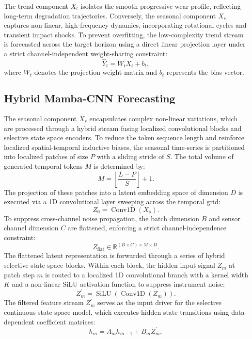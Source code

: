 \documentclass[cmes,article,submit,moreauthors,pdftex]{Definitions/tsp}
\begin{document}
The trend component $X_{t}$ isolates the smooth progressive wear profile, reflecting long-term degradation trajectories. Conversely, the seasonal component $X_{s}$ captures non-linear, high-frequency dynamics, incorporating rotational cycles and transient impact shocks. To prevent overfitting, the low-complexity trend stream is forecasted across the target horizon using a direct linear projection layer under a strict channel-independent weight-sharing constraint:
\begin{equation}
\widehat{Y}_{t} = W_{t} X_{t} + b_{t},
\tag{3}
\end{equation}
where $W_{t}$ denotes the projection weight matrix and $b_{t}$ represents the bias vector.

\subsection{Hybrid Mamba-CNN Forecasting} \label{sect:s3dot3}
The seasonal component $X_{s}$ encapsulates complex non-linear variations, which are processed through a hybrid stream fusing localized convolutional blocks and selective state space encoders. To reduce the token sequence length and reinforce localized spatial-temporal inductive biases, the seasonal time-series is partitioned into localized patches of size $P$ with a sliding stride of $S$. The total volume of generated temporal tokens $M$ is determined by:
\begin{equation}
M = \left\lfloor \frac{L - P}{S} \right\rfloor + 1.
\tag{4}
\end{equation}
The projection of these patches into a latent embedding space of dimension $D$ is executed via a 1D convolutional layer sweeping across the temporal grid:
\begin{equation}
Z_{0} = \operatorname{Conv1D}(X_{s}).
\tag{5}
\end{equation}
To suppress cross-channel noise propagation, the batch dimension $B$ and sensor channel dimension $C$ are flattened, enforcing a strict channel-independence constraint:
\begin{equation}
Z_{\text{flat}} \in \mathbb{R}^{(B \times C) \times M \times D}.
\tag{6}
\end{equation}
The flattened latent representation is forwarded through a series of hybrid selective state space blocks. Within each block, the hidden input signal $Z_{m}$ at patch step $m$ is routed to a localized 1D convolutional branch with a kernel width $K$ and a non-linear SiLU activation function to suppress instrument noise:
\begin{equation}
Z_{m}^{\prime} = \operatorname{SiLU}\left(\operatorname{Conv1D}(Z_{m})\right).
\tag{7}
\end{equation}
The filtered feature stream $Z_{m}^{\prime}$ serves as the input driver for the selective continuous state space model, which executes hidden state transitions using data-dependent coefficient matrices:
\begin{equation}
h_{m} = A_{m} h_{m-1} + B_{m} Z_{m}^{\prime},
\tag{8}
\end{equation}
\end{document}

